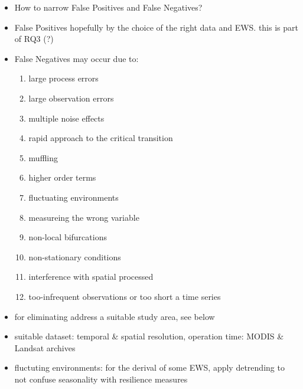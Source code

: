 \begin{itemize}
	\item How to narrow False Positives and False Negatives?
	\item False Positives hopefully by the choice of the right data and EWS. this is part of RQ3 (?)
	\item False Negatives may occur due to:
	\begin{enumerate}
		\item large process errors
		\item large observation errors
		\item multiple noise effects
		\item rapid approach to the critical transition
		\item muffling
		\item higher order terms
		\item fluctuating environments
		\item measureing the wrong variable
		\item non-local bifurcations
		\item non-stationary conditions
		\item interference with spatial processed
		\item too-infrequent observations or too short a time series
	\end{enumerate}
	\item for eliminating  address a suitable study area, see below
	\item suitable dataset: temporal \& spatial resolution, operation time: MODIS \& Landsat archives
	\item fluctuting environments: for the derival of some EWS, apply detrending to not confuse seasonality with resilience measures
\end{itemize}